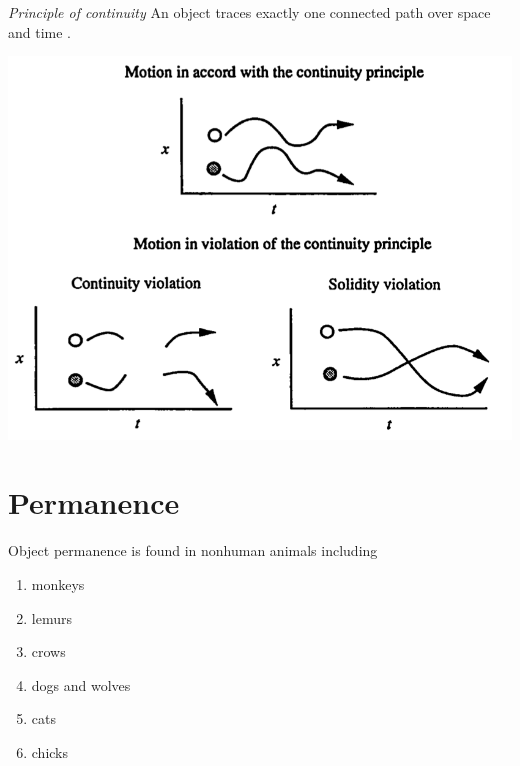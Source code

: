 \documentclass[12pt]{extarticle}
\begin{document}
\begin{multicols}{3}
\emph{Principle of continuity} An object traces exactly one connected path over space and time \citep[p.\ 113]{spelke:1995_spatiotemporal}.
 
\begin{center}
 
\includegraphics[scale=0.3]{../www.slides/src/files/img/spelke_1995_fig1.neg.png}
 
\end{center}
 
 
 \vfill
\columnbreak

\section{Permanence}
 
Object permanence is found in nonhuman animals including
 
\begin{enumerate}
 
\item monkeys \citep{santos:2006_cotton-top}
 
\item lemurs \citep{deppe:2009_object}
 
\item crows \citep{hoffmann:2011_ontogeny}
 
\item dogs and wolves \citep{fiset:2013_object}
 
\item cats \citep{triana:1981_object}
 
\item chicks \citep{chiandetti:2011_chicks_op}
 

\end{enumerate}
\end{multicols}
\end{document}
